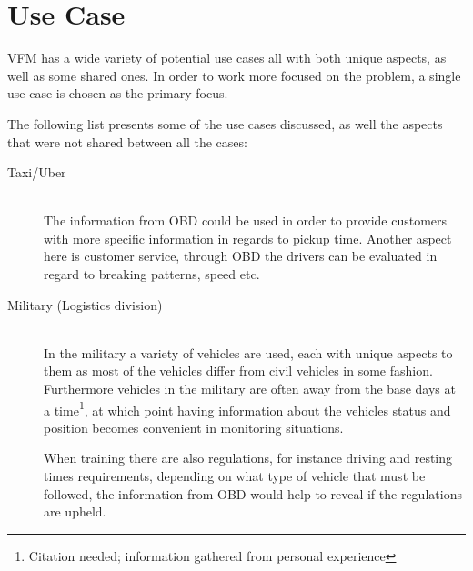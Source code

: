 \section{Use Case}\label{sec:use_case}
\acl{VFM} has a wide variety of potential use cases all with both unique aspects, as well as some shared ones.
In order to work more focused on the problem, a single use case is chosen as the primary focus.

The following list presents some of the use cases discussed, as well the aspects that were not shared between all the cases:

\begin{description}
    \item [Taxi/Uber] \hfill \\
    The information from \ac{OBD} could be used in order to provide customers with more specific information in regards to pickup time.
    Another aspect here is customer service, through \ac{OBD} the drivers can be evaluated in regard to breaking patterns, speed etc.
    \item [Military (Logistics division)] \hfill \\
    In the military a variety of vehicles are used, each with unique aspects to them as most of the vehicles differ from civil vehicles in some fashion.
    Furthermore vehicles in the military are often away from the base days at a time\footnote{Citation needed; information gathered from personal experience}, at which point having information about the vehicles status and position becomes convenient in monitoring situations.

    When training there are also regulations, for instance driving and resting times requirements, depending on what type of vehicle that must be followed, the information from \ac{OBD} would help to reveal if the regulations are upheld.


\end{description}
